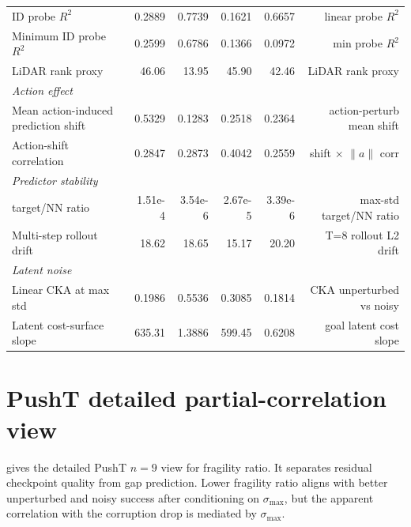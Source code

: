 \documentclass[10pt]{article}
\newcommand{\stdmax}{\ensuremath{\sigma_{\max}}}
\newcommand{\fragmetric}{target/NN ratio}
\newcommand{\fragility}{fragility ratio}
\newcommand{\idprobe}{ID probe $R^{2}$}
\begin{document}
\begin{landscape}
\begin{table}[p]
\begin{tabular}{lrrrrr}
\idprobe{} & 0.2889 & 0.7739 & 0.1621 & 0.6657 & linear probe $R^{2}$ \\
Minimum ID probe $R^{2}$ & 0.2599 & 0.6786 & 0.1366 & 0.0972 & min probe $R^{2}$ \\
LiDAR rank proxy & 46.06 & 13.95 & 45.90 & 42.46 & LiDAR rank proxy \\
\midrule
\multicolumn{6}{l}{\textit{Action effect}}\\
Mean action-induced prediction shift & 0.5329 & 0.1283 & 0.2518 & 0.2364 & action-perturb mean shift \\
Action-shift correlation & 0.2847 & 0.2873 & 0.4042 & 0.2559 & shift $\times$ $\|a\|$ corr \\
\midrule
\multicolumn{6}{l}{\textit{Predictor stability}}\\
\fragmetric{} & 1.51e-4 & 3.54e-6 & 2.67e-5 & 3.39e-6 & max-std target/NN ratio \\
Multi-step rollout drift & 18.62 & 18.65 & 15.17 & 20.20 & T=8 rollout L2 drift \\
\midrule
\multicolumn{6}{l}{\textit{Latent noise}}\\
Linear CKA at max std & 0.1986 & 0.5536 & 0.3085 & 0.1814 & CKA unperturbed vs noisy \\
Latent cost-surface slope & 635.31 & 1.3886 & 599.45 & 0.6208 & goal latent cost slope \\
\bottomrule
\end{tabular}%
\end{table}
\end{landscape}

\section{PushT detailed partial-correlation view}\label{sec:appendix-pusht-partial}

 gives the detailed PushT $n=9$ view for \fragility{}. It separates residual checkpoint quality from gap prediction. Lower \fragility{} aligns with better unperturbed and noisy success after conditioning on \stdmax{}, but the apparent correlation with the corruption drop is mediated by \stdmax{}.
\end{document}
